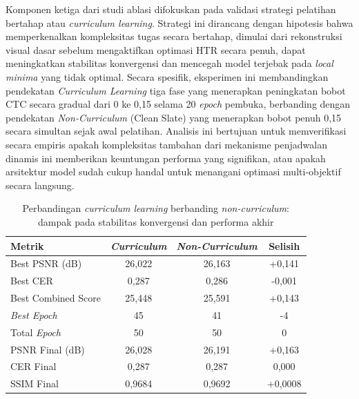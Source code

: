 Komponen ketiga dari studi ablasi difokuskan pada validasi strategi pelatihan bertahap atau \textit{curriculum learning}. Strategi ini dirancang dengan hipotesis bahwa memperkenalkan kompleksitas tugas secara bertahap, dimulai dari rekonstruksi visual dasar sebelum mengaktifkan optimasi HTR secara penuh, dapat meningkatkan stabilitas konvergensi dan mencegah model terjebak pada \textit{local minima} yang tidak optimal. Secara spesifik, eksperimen ini membandingkan pendekatan \textit{Curriculum Learning} tiga fase yang menerapkan peningkatan bobot CTC secara gradual dari 0 ke 0,15 selama 20 \textit{epoch} pembuka, berbanding dengan pendekatan \textit{Non-Curriculum} (Clean Slate) yang menerapkan bobot penuh 0,15 secara simultan sejak awal pelatihan. Analisis ini bertujuan untuk memverifikasi secara empiris apakah kompleksitas tambahan dari mekanisme penjadwalan dinamis ini memberikan keuntungan performa yang signifikan, atau apakah arsitektur model sudah cukup handal untuk menangani optimasi multi-objektif secara langsung.

\begin{table}[!htbp]
    \caption[Performa curriculum berbanding non-curriculum]{Perbandingan \textit{curriculum learning} berbanding \textit{non-curriculum}: dampak pada stabilitas konvergensi dan performa akhir}
    \label{tab:curriculum-comparison}
    \begin{tabularx}{\textwidth}{|>{\raggedright\arraybackslash}X|c|c|c|}
        \toprule
        \textbf{Metrik}              & \textbf{\textit{Curriculum}} & \textbf{\textit{Non-Curriculum}} & \textbf{Selisih} \\
        \midrule
        Best PSNR (dB)      & 26,022     & 26,163         & +0,141  \\
        Best CER            & 0,287      & 0,286          & -0,001  \\
        Best Combined Score & 25,448     & 25,591         & +0,143  \\
        \textit{Best Epoch}          & 45         & 41             & -4      \\
        Total \textit{Epoch}        & 50         & 50             & 0       \\
        \midrule
        PSNR Final (dB)     & 26,028     & 26,191         & +0,163  \\
        CER Final           & 0,287      & 0,287          & 0,000   \\
        SSIM Final          & 0,9684     & 0,9692         & +0,0008 \\
        \bottomrule
    \end{tabularx}
\end{table}

